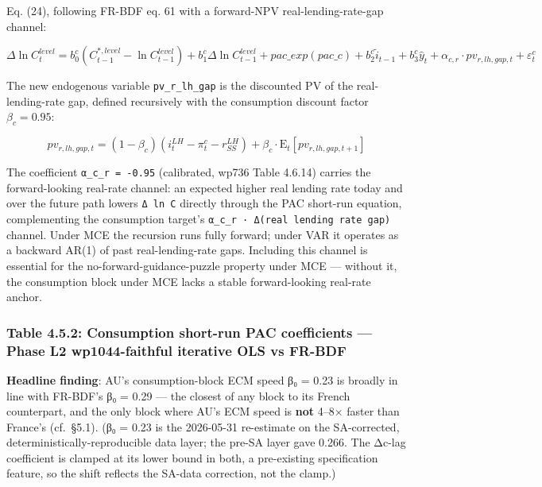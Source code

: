 \documentclass[
]{article}
\begin{document}
Eq. (24), following FR-BDF eq. 61 with a forward-NPV
real-lending-rate-gap channel:

\[\Delta \ln C^{level}_t = b^c_0 (C^{*,level}_{t-1} - \ln C^{level}_{t-1}) + b^c_1 \Delta \ln C^{level}_{t-1} + pac\_exp(pac\_c) + b^c_2 \tilde{i}_{t-1} + b^c_3 \hat{y}_t + \alpha_{c,r} \cdot pv_{r,lh,gap,t} + \varepsilon^c_t\]

The new endogenous variable \texttt{pv\_r\_lh\_gap} is the discounted PV
of the real-lending-rate gap, defined recursively with the consumption
discount factor \(\beta_c = 0.95\):

\[pv_{r,lh,gap,t} = (1-\beta_c)(i^{LH}_t - \pi^c_t - r^{LH}_{SS}) + \beta_c \cdot \mathrm{E}_t[pv_{r,lh,gap,t+1}]\]

The coefficient \texttt{α\_c\_r\ =\ -0.95} (calibrated, wp736 Table
4.6.14) carries the forward-looking real-rate channel: an expected
higher real lending rate today and over the future path lowers
\texttt{Δ\ ln\ C} directly through the PAC short-run equation,
complementing the consumption target's
\texttt{α\_c\_r\ ·\ Δ(real\ lending\ rate\ gap)} channel. Under MCE the
recursion runs fully forward; under VAR it operates as a backward AR(1)
of past real-lending-rate gaps. Including this channel is essential for
the no-forward-guidance-puzzle property under MCE --- without it, the
consumption block under MCE lacks a stable forward-looking real-rate
anchor.

\subsubsection{Table 4.5.2: Consumption short-run PAC coefficients ---
Phase L2 wp1044-faithful iterative OLS vs
FR-BDF}\label{table-4.5.2-consumption-short-run-pac-coefficients-phase-l2-wp1044-faithful-iterative-ols-vs-fr-bdf}

\textbf{Headline finding}: AU's consumption-block ECM speed β₀ = 0.23 is
broadly in line with FR-BDF's β₀ = 0.29 --- the closest of any block to
its French counterpart, and the only block where AU's ECM speed is
\textbf{not} 4--8× faster than France's (cf.~§5.1). (β₀ = 0.23 is the
2026-05-31 re-estimate on the SA-corrected,
deterministically-reproducible data layer; the pre-SA layer gave 0.266.
The Δc-lag coefficient is clamped at its lower bound in both, a
pre-existing specification feature, so the shift reflects the SA-data
correction, not the clamp.)
\end{document}
